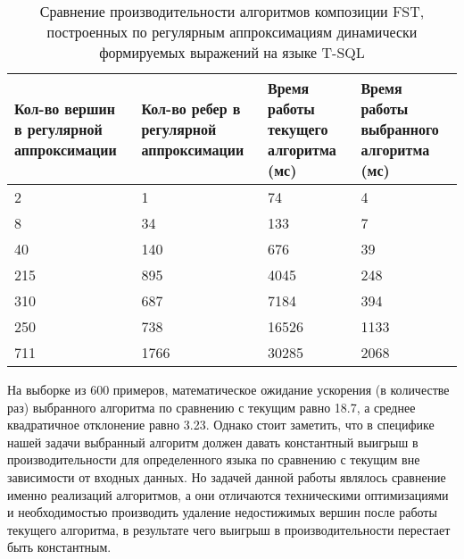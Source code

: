 \begin{table}[h]
  \centering
    \begin{tabular}{ p{2.5cm} | p{2.3cm} | p{2.4cm} | p{2.4cm}  }
  Кол-во вершин в регулярной аппроксимации &
  Кол-во ребер в регулярной аппроксимации & 
  Время работы текущего алгоритма (мс) & 
  Время работы выбранного алгоритма (мс) \\ \hline
  2 & 1 & 74 & 4 \\ \hline
  8 & 34 & 133 & 7 \\ \hline
  40 & 140 & 676 & 39 \\ \hline
  215 & 895 & 4045 & 248 \\ \hline
  310 & 687 & 7184 & 394 \\ \hline
  250 & 738 & 16526 & 1133 \\ \hline
  711 & 1766 & 30285 & 2068 \\ 
  \end{tabular}
  \caption{Сравнение производительности алгоритмов композиции FST, построенных по регулярным аппроксимациям динамически формируемых выражений на языке T-SQL}
  \label{table}
\end{table}

На выборке из 600 примеров, математическое ожидание ускорения (в количестве раз) выбранного алгоритма по сравнению с текущим равно 18.7, а среднее квадратичное отклонение равно 3.23. Однако стоит заметить, что в специфике нашей задачи выбранный алгоритм должен давать константный выигрыш в производительности для определенного языка по сравнению с текущим вне зависимости от входных данных. Но задачей данной работы являлось сравнение именно реализаций алгоритмов, а они отличаются техническими оптимизациями и необходимостью производить удаление недостижимых вершин после работы текущего алгоритма, в результате чего выигрыш в производительности перестает быть константным.

